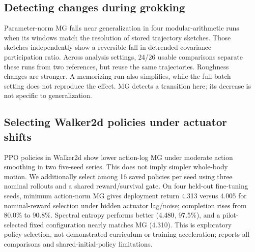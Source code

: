 {\subsection{Detecting changes during grokking}
Parameter-norm MG falls near generalization in four modular-arithmetic runs when its windows match the resolution of stored trajectory sketches. Those sketches independently show a reversible fall in detrended covariance participation ratio. Across analysis settings, 24/26 usable comparisons separate these runs from two references, but reuse the same trajectories. Roughness changes are stronger. A memorizing run also simplifies, while the full-batch setting does not reproduce the effect. MG detects a transition here; its decrease is not specific to generalization.

\subsection{Selecting Walker2d policies under actuator shifts}
PPO policies in Walker2d \citep{schulman2017proximal,todorov2012mujoco} show lower action-log MG under moderate action smoothing in two five-seed series. This does not imply simpler whole-body motion. We additionally select among 16 saved policies per seed using three nominal rollouts and a shared reward/survival gate. On four held-out fine-tuning seeds, minimum action-norm MG gives deployment return 4.313 versus 4.005 for nominal-reward selection under hidden actuator lag/noise; completion rises from 80.0\% to 90.8\%. Spectral entropy performs better (4.480, 97.5\%), and a pilot-selected fixed configuration nearly matches MG (4.310). This is exploratory policy selection, not demonstrated curriculum or training acceleration;  reports all comparisons and shared-initial-policy limitations.



}
